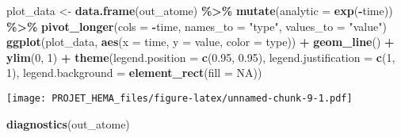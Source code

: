 \documentclass[
]{article}
\newenvironment{Shaded}{\begin{snugshade}}{\end{snugshade}}
\newcommand{\AttributeTok}[1]{\textcolor[rgb]{0.13,0.29,0.53}{#1}}
\newcommand{\ConstantTok}[1]{\textcolor[rgb]{0.56,0.35,0.01}{#1}}
\newcommand{\DecValTok}[1]{\textcolor[rgb]{0.00,0.00,0.81}{#1}}
\newcommand{\FloatTok}[1]{\textcolor[rgb]{0.00,0.00,0.81}{#1}}
\newcommand{\FunctionTok}[1]{\textcolor[rgb]{0.13,0.29,0.53}{\textbf{#1}}}
\newcommand{\NormalTok}[1]{#1}
\newcommand{\OtherTok}[1]{\textcolor[rgb]{0.56,0.35,0.01}{#1}}
\newcommand{\SpecialCharTok}[1]{\textcolor[rgb]{0.81,0.36,0.00}{\textbf{#1}}}
\newcommand{\StringTok}[1]{\textcolor[rgb]{0.31,0.60,0.02}{#1}}
\begin{document}
\begin{Shaded}
\begin{Highlighting}[]
\NormalTok{plot\_data }\OtherTok{\textless{}{-}} \FunctionTok{data.frame}\NormalTok{(out\_atome) }\SpecialCharTok{\%\textgreater{}\%}
  \FunctionTok{mutate}\NormalTok{(}\AttributeTok{analytic =} \FunctionTok{exp}\NormalTok{(}\SpecialCharTok{{-}}\NormalTok{time)) }\SpecialCharTok{\%\textgreater{}\%}
  \FunctionTok{pivot\_longer}\NormalTok{(}\AttributeTok{cols =} \SpecialCharTok{{-}}\NormalTok{time,}
               \AttributeTok{names\_to =} \StringTok{"type"}\NormalTok{,}
               \AttributeTok{values\_to =} \StringTok{"value"}\NormalTok{)}
\FunctionTok{ggplot}\NormalTok{(plot\_data, }\FunctionTok{aes}\NormalTok{(}\AttributeTok{x =}\NormalTok{ time, }\AttributeTok{y =}\NormalTok{ value, }\AttributeTok{color =}\NormalTok{ type)) }\SpecialCharTok{+}
  \FunctionTok{geom\_line}\NormalTok{() }\SpecialCharTok{+}
  \FunctionTok{ylim}\NormalTok{(}\DecValTok{0}\NormalTok{, }\DecValTok{1}\NormalTok{) }\SpecialCharTok{+}
  \FunctionTok{theme}\NormalTok{(}\AttributeTok{legend.position =} \FunctionTok{c}\NormalTok{(}\FloatTok{0.95}\NormalTok{, }\FloatTok{0.95}\NormalTok{),}
        \AttributeTok{legend.justification =} \FunctionTok{c}\NormalTok{(}\DecValTok{1}\NormalTok{, }\DecValTok{1}\NormalTok{),}
        \AttributeTok{legend.background =} \FunctionTok{element\_rect}\NormalTok{(}\AttributeTok{fill =} \ConstantTok{NA}\NormalTok{))}
\end{Highlighting}
\end{Shaded}

\texttt{[image: PROJET\_HEMA\_files/figure-latex/unnamed-chunk-9-1.pdf]}

\begin{Shaded}
\begin{Highlighting}[]
    \FunctionTok{diagnostics}\NormalTok{(out\_atome)}
\end{Highlighting}
\end{Shaded}
\end{document}
